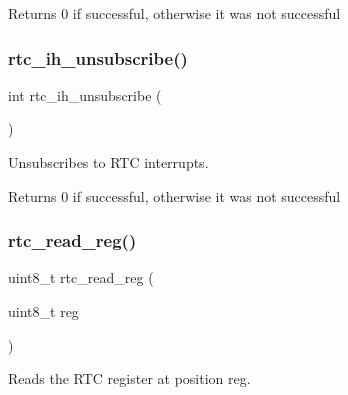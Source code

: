 \begin{DoxyReturn}{Returns}
0 if successful, otherwise it was not successful 
\end{DoxyReturn}
\mbox{\label{group__rtc_ga9c629cc80f25b7d9d4e19fb6f6de8ea4}} 
\subsubsection{\texorpdfstring{rtc\+\_\+ih\+\_\+unsubscribe()}{rtc\_ih\_unsubscribe()}}
{\footnotesize\ttfamily int rtc\+\_\+ih\+\_\+unsubscribe (\begin{DoxyParamCaption}{ }\end{DoxyParamCaption})}



Unsubscribes to R\+TC interrupts. 

\begin{DoxyReturn}{Returns}
0 if successful, otherwise it was not successful 
\end{DoxyReturn}
\mbox{\label{group__rtc_ga967406c372c2ba0b6b18c4784d5b1ce2}} 
\subsubsection{\texorpdfstring{rtc\+\_\+read\+\_\+reg()}{rtc\_read\_reg()}}
{\footnotesize\ttfamily uint8\+\_\+t rtc\+\_\+read\+\_\+reg (\begin{DoxyParamCaption}\item[{uint8\+\_\+t}]{reg }\end{DoxyParamCaption})}



Reads the R\+TC register at position reg. 


